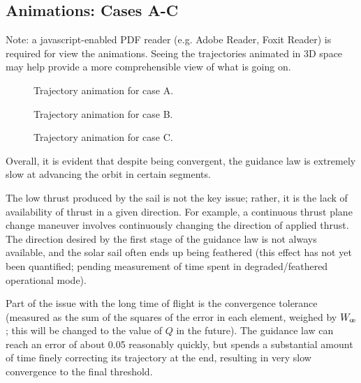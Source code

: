 \subsection{Animations: Cases A-C}
Note: a javascript-enabled PDF reader (e.g. Adobe Reader, Foxit Reader) is required for view the animations. Seeing the trajectories animated in 3D space may help provide a more comprehensible view of what is going on.

\begin{figure}[H]
  \caption{Trajectory animation for case A.}
  \label{fig:anim_a}
\end{figure}

\begin{figure}[H]
  \caption{Trajectory animation for case B.}
  \label{fig:anim_b}
\end{figure}

\begin{figure}[H]
  \caption{Trajectory animation for case C.}
  \label{fig:anim_c}
\end{figure}



Overall, it is evident that despite being convergent, the guidance law is extremely slow at advancing the orbit in certain segments.

The low thrust produced by the sail is not the key issue; rather, it is the lack of availability of thrust in a given direction. For example, a continuous thrust plane change maneuver involves continuously changing the direction of applied thrust. The direction desired by the first stage of the guidance law is not always available, and the solar sail often ends up being feathered (this effect has not yet been quantified; pending measurement of time spent in degraded/feathered operational mode).

Part of the issue with the long time of flight is the convergence tolerance (measured as the sum of the squares of the error in each element, weighed by \(W_{\moe}\); this will be changed to the value of \(Q\) in the future). The guidance law can reach an error of about 0.05 reasonably quickly, but spends a substantial amount of time finely correcting its trajectory at the end, resulting in very slow convergence to the final threshold.

